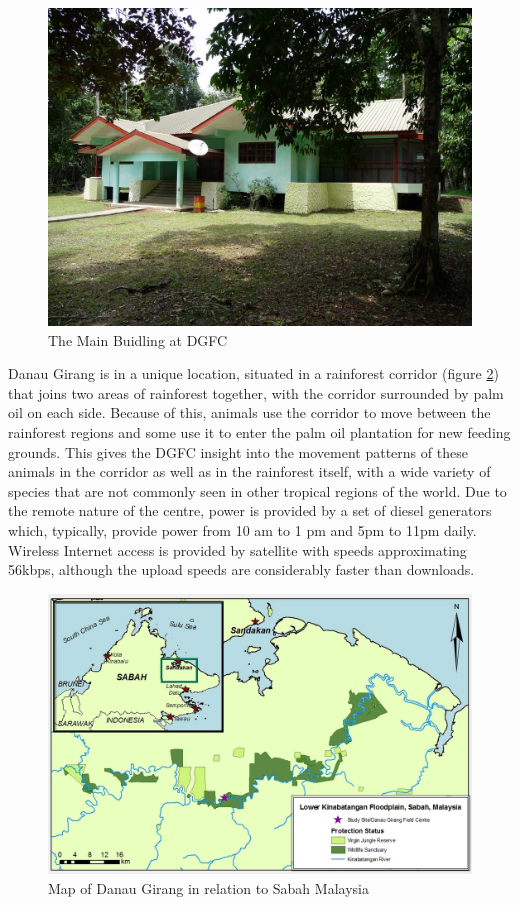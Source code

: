 		\begin{figure}[h]
		\centering
		\includegraphics[width=\textwidth]{Chap3/figures/field_centre}
		\caption{The Main Buidling at DGFC}
		\label{tech:fig:main}
		\end{figure}

Danau Girang is in a unique location, situated in a rainforest corridor (figure \ref{tech:fig:map}) that joins two areas of rainforest together, with the corridor surrounded by palm oil on each side. Because of this, animals use the corridor to move between the rainforest regions and some use it to enter the palm oil plantation for new feeding grounds. This gives the DGFC insight into the movement patterns of these animals in the corridor as well as in the rainforest itself, with a wide variety of species that are not commonly seen in other tropical regions of the world. Due to the remote nature of the centre, power is provided by a set of diesel generators which, typically, provide power from 10 am to 1 pm and 5pm to 11pm daily. Wireless Internet access is provided by satellite with speeds approximating 56kbps, although the upload speeds are considerably faster than downloads.

		\begin{figure}[h]
		\centering
		\includegraphics[width=\textwidth]{Chap3/figures/dgfc_map}
		\caption{Map of Danau Girang in relation to Sabah Malaysia}
		\label{tech:fig:map}
		\end{figure}


